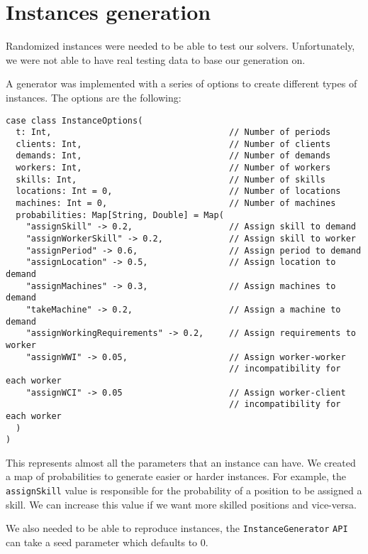 \documentclass[../thesis.tex]{subfiles}
\begin{document}
\section{Instances generation}
\label{section:instance-gen}

Randomized instances were needed to be able to test our solvers. Unfortunately, we were not 
able to have real testing data to base our generation on. 

A generator was implemented with a series of options to create different types of instances. The options are the following:


\begin{lstlisting}[style=scalaStyle,label={instance:options},caption={Instance options},captionpos=b]
case class InstanceOptions(
  t: Int,                                   // Number of periods 
  clients: Int,                             // Number of clients 
  demands: Int,                             // Number of demands 
  workers: Int,                             // Number of workers 
  skills: Int,                              // Number of skills 
  locations: Int = 0,                       // Number of locations 
  machines: Int = 0,                        // Number of machines
  probabilities: Map[String, Double] = Map(
    "assignSkill" -> 0.2,                   // Assign skill to demand
    "assignWorkerSkill" -> 0.2,             // Assign skill to worker
    "assignPeriod" -> 0.6,                  // Assign period to demand
    "assignLocation" -> 0.5,                // Assign location to demand
    "assignMachines" -> 0.3,                // Assign machines to demand
    "takeMachine" -> 0.2,                   // Assign a machine to demand
    "assignWorkingRequirements" -> 0.2,     // Assign requirements to worker
    "assignWWI" -> 0.05,                    // Assign worker-worker 
                                            // incompatibility for each worker 
    "assignWCI" -> 0.05                     // Assign worker-client
                                            // incompatibility for each worker
  )
)
\end{lstlisting}

This represents almost all the parameters that an instance can have. We created a
map of probabilities to generate easier or harder instances. For example,
the \texttt{assignSkill} value is responsible for the probability of a position to be assigned a skill. 
We can increase this value if we want more skilled positions and vice-versa.

We also needed to be able to reproduce instances, the \texttt{InstanceGenerator} \texttt{API} can 
take a seed parameter which defaults to $0$.
\end{document}
